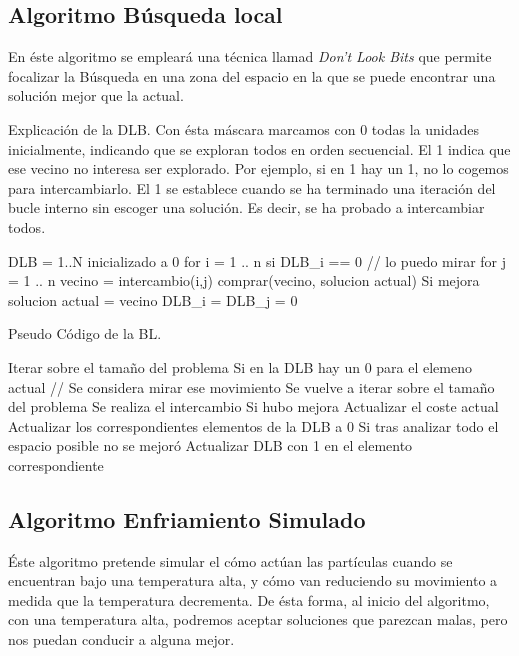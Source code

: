 \documentclass[10pt,a4paper]{article}
\begin{document}
\subsection{Algoritmo Búsqueda local}

En éste algoritmo se empleará una técnica llamad \textit{Don't Look Bits} que permite focalizar la Búsqueda en una zona del espacio en la que se puede encontrar una solución mejor que la actual.

Explicación de la DLB. Con ésta máscara marcamos con 0 todas la unidades inicialmente, indicando que se exploran todos en  orden secuencial. El 1 indica que ese vecino no interesa ser explorado. Por ejemplo, si en 1 hay un 1, no lo cogemos para intercambiarlo. El 1 se establece cuando se ha terminado una iteración del bucle interno sin escoger una solución. Es decir, se ha probado a intercambiar todos.

\begin{ccode}
        DLB = 1..N inicializado a 0
        for i = 1 .. n
            si DLB_i == 0 // lo puedo mirar
                for j = 1 .. n
                    vecino = intercambio(i,j)
                    comprar(vecino, solucion actual)
                    Si mejora solucion actual = vecino
                    DLB_i = DLB_j = 0 
\end{ccode}
Pseudo Código de la BL.
\begin{ccode}
    Iterar sobre el tamaño del problema
        Si en la DLB hay un 0 para el elemeno actual // Se considera mirar ese movimiento
            Se vuelve a iterar sobre el tamaño del problema
                Se realiza el intercambio
                Si hubo mejora
                    Actualizar el coste actual
                    Actualizar los correspondientes elementos de la DLB a 0
            Si tras analizar todo el espacio posible no se mejoró
                Actualizar DLB con 1 en el elemento correspondiente
\end{ccode}

\subsection{Algoritmo Enfriamiento Simulado}

Éste algoritmo pretende simular el cómo actúan las partículas cuando se encuentran bajo una temperatura alta, y cómo van reduciendo su movimiento a medida que la temperatura decrementa. De ésta forma, al inicio del algoritmo, con una temperatura alta, podremos aceptar soluciones que parezcan malas, pero nos puedan conducir a alguna mejor.
\end{document}
